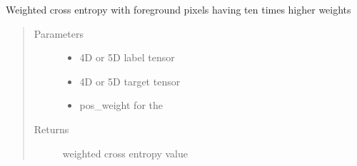 \documentclass[letterpaper,10pt,english]{sphinxmanual}
\begin{document}
\begin{fulllineitems}
\label{\detokenize{index:unet.loss.weighted_cross_entropy_fun}}
Weighted cross entropy with foreground pixels having ten times higher weights
\begin{quote}\begin{description}
\item[{Parameters}] \leavevmode\begin{itemize}
\item {} 
 \textendash{} 4D or 5D label tensor

\item {} 
 \textendash{} 4D or 5D target tensor

\item {} 
 \textendash{} pos\_weight for the 

\end{itemize}

\item[{Returns}] \leavevmode
weighted cross entropy value

\end{description}\end{quote}

\end{fulllineitems}

\end{document}
